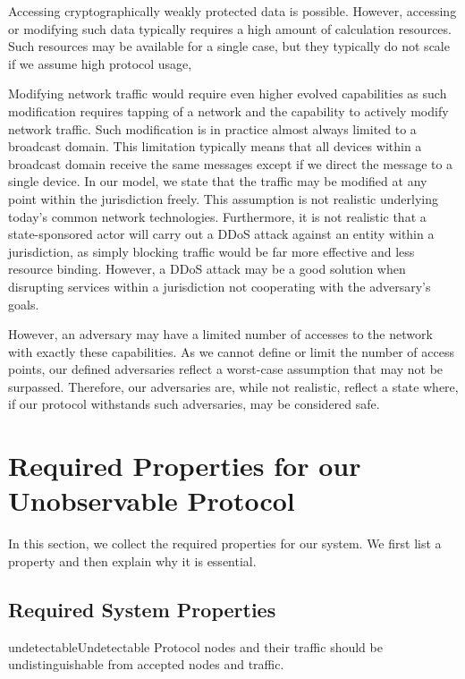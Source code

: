 Accessing cryptographically weakly protected data is possible. However, accessing or modifying such data typically requires a high amount of calculation resources. Such resources may be available for a single case, but they typically do not scale if we assume high protocol usage,

Modifying network traffic would require even higher evolved capabilities as such modification requires tapping of a network and the capability to actively modify network traffic. Such modification is in practice almost always limited to a broadcast domain. This limitation typically means that all devices within a broadcast domain receive the same messages except if we direct the message to a single device. In our model, we state that the traffic may be modified at any point within the jurisdiction freely. This assumption is not realistic underlying today's common network technologies.
Furthermore, it is not realistic that a state-sponsored actor will carry out a DDoS attack against an entity within a jurisdiction, as simply blocking traffic would be far more effective and less resource binding. However, a DDoS attack may be a good solution when disrupting services within a jurisdiction not cooperating with the adversary's goals.

However, an adversary may have a limited number of accesses to the network with exactly these capabilities. As we cannot define or limit the number of access points, our defined adversaries reflect a worst-case assumption that may not be surpassed. Therefore, our adversaries are, while not realistic, reflect a state where, if our protocol withstands such adversaries, may be considered safe.

\section{Required Properties for our Unobservable Protocol}\label{sec:properties}
In this section, we collect the required properties for our system. We first list a property and then explain why it is essential.

\subsection{Required System Properties}\label{sec:requirements}

\begin{requirement}{undetectable}{Undetectable}
	Protocol nodes and their traffic should be undistinguishable from accepted nodes and traffic. 
\end{requirement}


